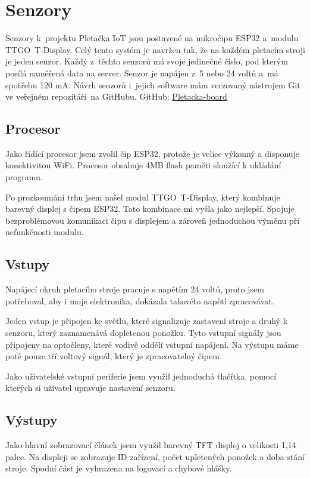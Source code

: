 \chapter{Senzory}

Senzory k~projektu Pletačka IoT jsou postavené na mikročipu ESP32 a~modulu TTGO~T-Display.
Celý tento systém je navržen tak, že na každém pletacím stroji je jeden senzor.
Každý z~těchto senzorů má svoje jedinečné číslo, pod kterým posílá naměřená data na server.
Senzor je napájen z~5 nebo 24 voltů a~má spotřebu 120 mA.
Návrh senzorů i~jejich software mám verzovaný nástrojem Git ve veřejném repozitáři~na GitHubu.\newline
GitHub: \href{https://github.com/Pletacka-IoT/Pletacka-board}{Pletacka-board}\cite{PL_BOARD}

\section{Procesor}
Jako řídící procesor jsem zvolil čip ESP32, protože je velice výkonný a disponuje konektivitou WiFi.
Procesor obsahuje 4MB flash paměti sloužící k ukládání programu.

Po prozkoumání trhu jsem našel modul TTGO~T-Display, který kombinuje barevný displej s čipem ESP32.
Tato kombinace mi vyšla jako nejlepší. 
Spojuje bezproblémovou komunikaci čipu s displejem a zároveň jednoduchou výměnu při nefunkčnosti modulu.


\section{Vstupy}
Napájecí okruh pletacího stroje pracuje s napětím 24 voltů, proto jsem potřeboval, aby i moje elektronika, dokázala takovéto napětí zpracovávat.

Jeden vstup je připojen ke světlu, které signalizuje zastavení stroje a druhý k senzoru, který zaznamenává dopletenou ponožku.
Tyto vstupní signály jsou připojeny na optočleny, které vodivě oddělí vstupní napájení.
Na výstupu máme poté pouze tří voltový signál, který je zpracovatelný čipem.

Jako uživatelské vstupní periferie jsem využil jednoduchá tlačítka, pomocí kterých si uživatel upravuje nastavení senzoru.


\section{Výstupy}
Jako hlavní zobrazovací článek jsem využil barevný TFT displej o velikosti 1,14 palce.
Na displeji se zobrazuje ID zařízení, počet upletených ponožek a doba stání stroje.
Spodní část je vyhrazena na logovací a chybové hlášky.

